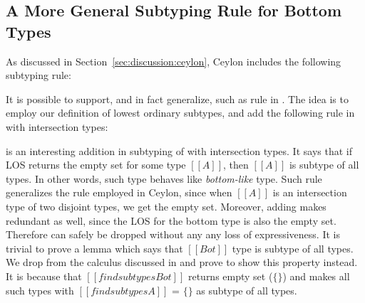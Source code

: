 \subsection{A More General Subtyping Rule for Bottom  Types}
\label{sec:inter:refactoring}
As discussed in Section~\ref{sec:discussion:ceylon}, Ceylon includes the following subtyping rule:

\begin{center}
\end{center}

\noindent It is possible to support, and in fact generalize, such as rule in \name. The idea is to
employ our definition of lowest ordinary subtypes, and add the following rule 
in \cal with intersection types:

\begin{center}
\end{center}

\noindent {} is an interesting addition in subtyping of \cal with intersection types.
It says that if LOS returns the empty set for some type $[[A]]$, then $[[A]]$
is subtype of all types. In other words, such type behaves like \emph{bottom-like} type.
Such rule generalizes the rule employed in Ceylon, since when $[[A]]$ is an intersection type of two
disjoint types, we get the empty set.
Moreover, adding  makes  redundant as well, since the LOS for
the bottom type is also the empty set. Therefore  can safely be dropped without any
any loss of expressiveness. It is trivial to prove a lemma which says that $[[Bot]]$ type is
subtype of all types. We drop  from the calculus discussed in 
and prove  to show this property instead. It is because that $[[findsubtypes Bot]]$
returns empty set ($\{\}$) and  makes all such types with $[[findsubtypes A]]$ = $\{\}$ as
subtype of all types.

